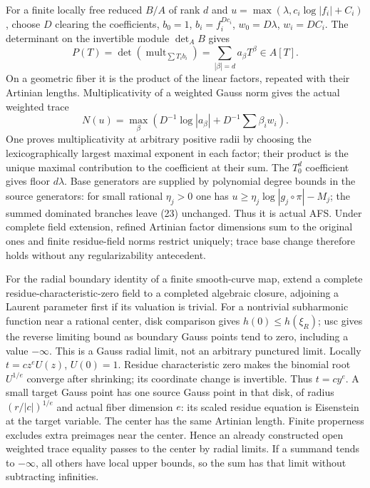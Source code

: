 \documentclass[
  11pt,
]{article}
\begin{document}
For a finite locally free reduced \(B/A\) of rank \(d\) and
\(u=\max(\lambda,c_i\log|f_i|+C_i)\), choose \(D\) clearing the
coefficients, \(b_0=1\), \(b_i=f_i^{Dc_i}\), \(w_0=D\lambda\),
\(w_i=DC_i\). The determinant on the invertible module \(\det_A B\)
gives \[P(T)=\det(\operatorname{mult}_{\sum T_i b_i})
             =\sum_{|\beta|=d}a_\beta T^\beta\in A[T].\] On a geometric
fiber it is the product of the linear factors, repeated with their
Artinian lengths. Multiplicativity of a weighted Gauss norm gives the
actual weighted trace \[N(u)=\max_\beta\left(D^{-1}\log|a_\beta|
                         +D^{-1}\sum\beta_iw_i\right). \tag{23}\] One
proves multiplicativity at arbitrary positive radii by choosing the
lexicographically largest maximal exponent in each factor; their product
is the unique maximal contribution to the coefficient at their sum. The
\(T_0^d\) coefficient gives floor \(d\lambda\). Base generators are
supplied by polynomial degree bounds in the source generators: for small
rational \(\eta_j>0\) one has \(u\ge\eta_j\log|g_j\circ\pi|-M_j\); the
summed dominated branches leave (23) unchanged. Thus it is actual AFS.
Under complete field extension, refined Artinian factor dimensions sum
to the original ones and finite residue-field norms restrict uniquely;
trace base change therefore holds without any regularizability
antecedent.

For the radial boundary identity of a finite smooth-curve map, extend a
complete residue-characteristic-zero field to a completed algebraic
closure, adjoining a Laurent parameter first if its valuation is
trivial. For a nontrivial subharmonic function near a rational center,
disk comparison gives \(h(0)\le h(\xi_R)\); usc gives the reverse
limiting bound as boundary Gauss points tend to zero, including a value
\(-\infty\). This is a Gauss radial limit, not an arbitrary punctured
limit. Locally \(t=c z^eU(z)\), \(U(0)=1\). Residue characteristic zero
makes the binomial root \(U^{1/e}\) converge after shrinking; its
coordinate change is invertible. Thus \(t=cy^e\). A small target Gauss
point has one source Gauss point in that disk, of radius
\((r/|c|)^{1/e}\) and actual fiber dimension \(e\): its scaled residue
equation is Eisenstein at the target variable. The center has the same
Artinian length. Finite properness excludes extra preimages near the
center. Hence an already constructed open weighted trace equality passes
to the center by radial limits. If a summand tends to \(-\infty\), all
others have local upper bounds, so the sum has that limit without
subtracting infinities.
\end{document}
